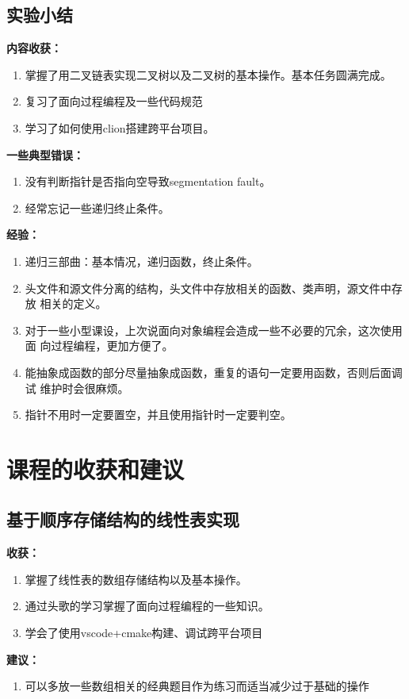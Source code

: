\documentclass[supercite]{Experimental_Report}
\theoremstyle{definition}
\begin{document}
\subsection{实验小结}
	\noindent \textbf{内容收获：}
	\begin{enumerate}
		\item 掌握了用二叉链表实现二叉树以及二叉树的基本操作。基本任务圆满完成。
		\item 复习了面向过程编程及一些代码规范
		\item 学习了如何使用clion搭建跨平台项目。
	\end{enumerate}
	\noindent \textbf{一些典型错误：}
	\begin{enumerate}
		\item 没有判断指针是否指向空导致segmentation fault。
		\item 经常忘记一些递归终止条件。
	\end{enumerate}
	\noindent \textbf{经验：}
	\begin{enumerate}
		\item 递归三部曲：基本情况，递归函数，终止条件。
		\item 头文件和源文件分离的结构，头文件中存放相关的函数、类声明，源文件中存放
		相关的定义。
		\item 对于一些小型课设，上次说面向对象编程会造成一些不必要的冗余，这次使用面
		向过程编程，更加方便了。
		\item 能抽象成函数的部分尽量抽象成函数，重复的语句一定要用函数，否则后面调试
		维护时会很麻烦。
		\item 指针不用时一定要置空，并且使用指针时一定要判空。
	\end{enumerate}

\newpage

\section{课程的收获和建议}

\subsection{基于顺序存储结构的线性表实现}
	\noindent\textbf{收获：}
	\begin{enumerate}
		\item 掌握了线性表的数组存储结构以及基本操作。
		\item 通过头歌的学习掌握了面向过程编程的一些知识。
		\item 学会了使用vscode+cmake构建、调试跨平台项目
	\end{enumerate}
	\noindent\textbf{建议：}
	\begin{enumerate}
		\item 可以多放一些数组相关的经典题目作为练习而适当减少过于基础的操作
	\end{enumerate}
\end{document}
